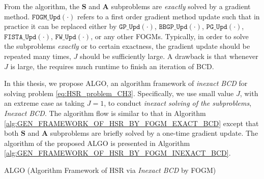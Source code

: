 From the algorithm, the $\bm S$ and $\bm A$ subproblems are \textit{exactly}
solved by a gradient method.
$\texttt{FOGM\_Upd}(\cdot)$ refers to a first order gradient method update
such that in practice it can be replaced either by $\texttt{GP\_Upd}(\cdot)$,
$\texttt{BBGP\_Upd}(\cdot)$, $\texttt{PG\_Upd}(\cdot)$,
$\texttt{FISTA\_Upd}(\cdot)$, $\texttt{FW\_Upd}(\cdot)$, or any other FOGMs.
Typically, in order to solve the subproblems \textit{exactly} or to certain
exactness, the gradient update should be repeated many times, \ie $J$ should
be sufficiently large.
A drawback is that whenever $J$ is large, the requires much runtime to finish
an iteration of BCD.

In this thesis, we propose ALGO, an algorithm framework of \textit{inexact BCD}
for solving problem \eqref{eq:HSR_problem_CH3}.
Specifically, we use small value $J$, with an extreme case as taking $J = 1$,
to conduct \textit{inexact solving of the subproblems}, \ie \textit{Inexact BCD}.
The algorithm flow is similar to that in Algorithm
\ref{alg:GEN_FRAMEWORK_OF_HSR_BY_FOGM_EXACT_BCD} except that both $\bm S$ and
$\bm A$ subproblems are briefly solved by a one-time gradient update.
The algorithm of the proposed ALGO is presented in Algorithm
\ref{alg:GEN_FRAMEWORK_OF_HSR_BY_FOGM_INEXACT_BCD}.
\begin{algorithm}
    \caption{ALGO (Algorithm Framework of HSR via \textit{Inexact BCD} by FOGM)}
    \label{alg:GEN_FRAMEWORK_OF_HSR_BY_FOGM_INEXACT_BCD}
    \begin{algorithmic}[1]
        \smallskip
            \smallskip
            \smallskip
            \smallskip
            \smallskip
            \smallskip
            \smallskip
        \EndFor
        \smallskip
    \end{algorithmic}
\end{algorithm}

